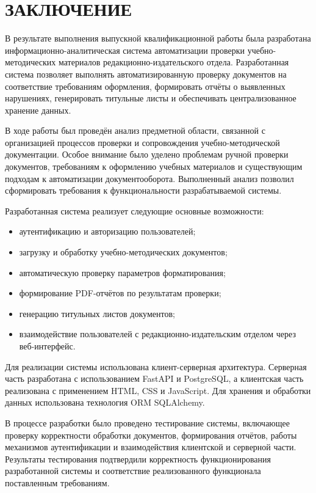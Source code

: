 \newpage
\section*{ЗАКЛЮЧЕНИЕ}

В результате выполнения выпускной квалификационной работы была разработана информационно-аналитическая система автоматизации проверки учебно-методических материалов редакционно-издательского отдела. Разработанная система позволяет выполнять автоматизированную проверку документов на соответствие требованиям оформления, формировать отчёты о выявленных нарушениях, генерировать титульные листы и обеспечивать централизованное хранение данных.

В ходе работы был проведён анализ предметной области, связанной с организацией процессов проверки и сопровождения учебно-методической документации. Особое внимание было уделено проблемам ручной проверки документов, требованиям к оформлению учебных материалов и существующим подходам к автоматизации документооборота. Выполненный анализ позволил сформировать требования к функциональности разрабатываемой системы.

Разработанная система реализует следующие основные возможности:
\begin{itemize}
	\item аутентификацию и авторизацию пользователей;
	
	\item загрузку и обработку учебно-методических документов;
	
	\item автоматическую проверку параметров форматирования;
	
	\item формирование PDF-отчётов по результатам проверки;
	
	\item генерацию титульных листов документов;
	
	\item взаимодействие пользователей с редакционно-издательским отделом через веб-интерфейс.
\end{itemize}

Для реализации системы использована клиент-серверная архитектура. Серверная часть разработана с использованием FastAPI и PostgreSQL, а клиентская часть реализована с применением HTML, CSS и JavaScript. Для хранения и обработки данных использована технология ORM SQLAlchemy.

В процессе разработки было проведено тестирование системы, включающее проверку корректности обработки документов, формирования отчётов, работы механизмов аутентификации и взаимодействия клиентской и серверной части. Результаты тестирования подтвердили корректность функционирования разработанной системы и соответствие реализованного функционала поставленным требованиям.

